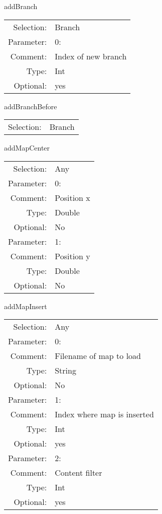 \item addBranch\\
\begin{tabular}{rl}
  Selection: & Branch\\
   Parameter: &  0:\\
        Comment: & Index of new branch\\
           Type: & Int\\
       Optional: &  yes\\
\end{tabular}

\item addBranchBefore\\
\begin{tabular}{rl}
  Selection: & Branch\\
\end{tabular}

\item addMapCenter\\
\begin{tabular}{rl}
  Selection: & Any\\
   Parameter: &  0:\\
        Comment: & Position x\\
           Type: & Double\\
       Optional: &  No\\
   Parameter: &  1:\\
        Comment: & Position y\\
           Type: & Double\\
       Optional: &  No\\
\end{tabular}

\item addMapInsert\\
\begin{tabular}{rl}
  Selection: & Any\\
   Parameter: &  0:\\
        Comment: & Filename of map to load\\
           Type: & String\\
       Optional: &  No\\
   Parameter: &  1:\\
        Comment: & Index where map is inserted\\
           Type: & Int\\
       Optional: &  yes\\
   Parameter: &  2:\\
        Comment: & Content filter\\
           Type: & Int\\
       Optional: &  yes\\
\end{tabular}

